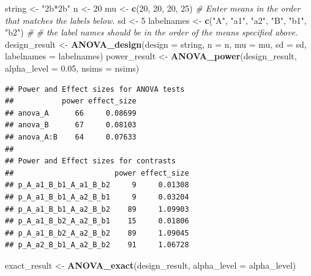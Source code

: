 \documentclass[]{book}
\newenvironment{Shaded}{\begin{snugshade}}{\end{snugshade}}
\newcommand{\CommentTok}[1]{\textcolor[rgb]{0.56,0.35,0.01}{\textit{#1}}}
\newcommand{\DataTypeTok}[1]{\textcolor[rgb]{0.13,0.29,0.53}{#1}}
\newcommand{\DecValTok}[1]{\textcolor[rgb]{0.00,0.00,0.81}{#1}}
\newcommand{\FloatTok}[1]{\textcolor[rgb]{0.00,0.00,0.81}{#1}}
\newcommand{\KeywordTok}[1]{\textcolor[rgb]{0.13,0.29,0.53}{\textbf{#1}}}
\newcommand{\NormalTok}[1]{#1}
\newcommand{\StringTok}[1]{\textcolor[rgb]{0.31,0.60,0.02}{#1}}
\begin{document}
\begin{Shaded}
\begin{Highlighting}[]
\NormalTok{string <-}\StringTok{ "2b*2b"}
\NormalTok{n <-}\StringTok{ }\DecValTok{20}
\NormalTok{mu <-}\StringTok{ }\KeywordTok{c}\NormalTok{(}\DecValTok{20}\NormalTok{, }\DecValTok{20}\NormalTok{, }\DecValTok{20}\NormalTok{, }\DecValTok{25}\NormalTok{) }
\CommentTok{# Enter means in the order that matches the labels below.}
\NormalTok{sd <-}\StringTok{ }\DecValTok{5}
\NormalTok{labelnames <-}\StringTok{ }\KeywordTok{c}\NormalTok{(}\StringTok{"A"}\NormalTok{, }\StringTok{"a1"}\NormalTok{, }\StringTok{"a2"}\NormalTok{, }\StringTok{"B"}\NormalTok{, }\StringTok{"b1"}\NormalTok{, }\StringTok{"b2"}\NormalTok{) }\CommentTok{#}
\CommentTok{# the label names should be in the order of the means specified above.}
\NormalTok{design_result <-}\StringTok{ }\KeywordTok{ANOVA_design}\NormalTok{(}\DataTypeTok{design =}\NormalTok{ string,}
                   \DataTypeTok{n =}\NormalTok{ n, }
                   \DataTypeTok{mu =}\NormalTok{ mu, }
                   \DataTypeTok{sd =}\NormalTok{ sd, }
                   \DataTypeTok{labelnames =}\NormalTok{ labelnames)}
\NormalTok{power_result <-}\StringTok{ }\KeywordTok{ANOVA_power}\NormalTok{(design_result, }\DataTypeTok{alpha_level =} \FloatTok{0.05}\NormalTok{, }\DataTypeTok{nsims =}\NormalTok{ nsims)}
\end{Highlighting}
\end{Shaded}

\begin{verbatim}
## Power and Effect sizes for ANOVA tests
##           power effect_size
## anova_A      66     0.08699
## anova_B      67     0.08103
## anova_A:B    64     0.07633
## 
## Power and Effect sizes for contrasts
##                       power effect_size
## p_A_a1_B_b1_A_a1_B_b2     9     0.01308
## p_A_a1_B_b1_A_a2_B_b1     9     0.03204
## p_A_a1_B_b1_A_a2_B_b2    89     1.09903
## p_A_a1_B_b2_A_a2_B_b1    15     0.01806
## p_A_a1_B_b2_A_a2_B_b2    89     1.09045
## p_A_a2_B_b1_A_a2_B_b2    91     1.06728
\end{verbatim}

\begin{Shaded}
\begin{Highlighting}[]
\NormalTok{exact_result <-}\StringTok{ }\KeywordTok{ANOVA_exact}\NormalTok{(design_result, }\DataTypeTok{alpha_level =}\NormalTok{ alpha_level)}
\end{Highlighting}
\end{Shaded}
\end{document}
